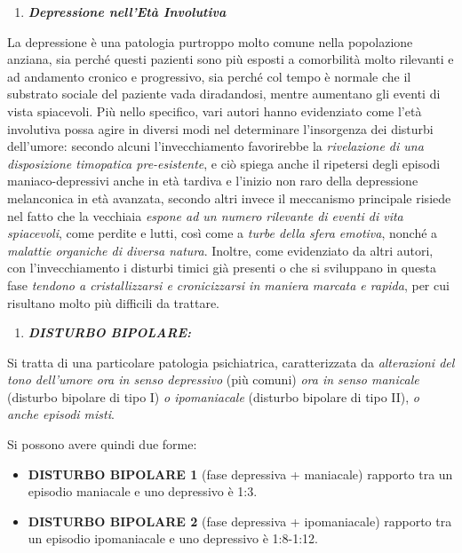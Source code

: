 \documentclass[]{article}
\begin{document}
\begin{enumerate}
\def\labelenumi{\arabic{enumi}.}
\item
  \textbf{\emph{Depressione nell'Età Involutiva}}
\end{enumerate}

La depressione è una patologia purtroppo molto comune nella popolazione
anziana, sia perché questi pazienti sono più esposti a comorbilità molto
rilevanti e ad andamento cronico e progressivo, sia perché col tempo è
normale che il substrato sociale del paziente vada diradandosi, mentre
aumentano gli eventi di vista spiacevoli. Più nello specifico, vari
autori hanno evidenziato come l'età involutiva possa agire in diversi
modi nel determinare l'insorgenza dei disturbi dell'umore: secondo
alcuni l'invecchiamento favorirebbe la \emph{rivelazione di una
disposizione timopatica pre-esistente}, e ciò spiega anche il ripetersi
degli episodi maniaco-depressivi anche in età tardiva e l'inizio non
raro della depressione melanconica in età avanzata, secondo altri invece
il meccanismo principale risiede nel fatto che la vecchiaia \emph{espone
ad un numero rilevante di eventi di vita spiacevoli}, come perdite e
lutti, così come a \emph{turbe della sfera emotiva}, nonché a
\emph{malattie organiche di diversa natura}. Inoltre, come evidenziato
da altri autori, con l'invecchiamento i disturbi timici già presenti o
che si sviluppano in questa fase \emph{tendono a cristallizzarsi e
cronicizzarsi in maniera marcata e rapida}, per cui risultano molto più
difficili da trattare.

\begin{enumerate}
\def\labelenumi{\arabic{enumi}.}
\item
  \textbf{\emph{DISTURBO BIPOLARE:}}
\end{enumerate}

Si tratta di una particolare patologia psichiatrica, caratterizzata da
\emph{alterazioni del tono dell'umore ora in senso depressivo} (più
comuni) \emph{ora in senso manicale} (disturbo bipolare di tipo I)
\emph{o ipomaniacale} (disturbo bipolare di tipo II), \emph{o anche
episodi misti}.

Si possono avere quindi due forme:

\begin{itemize}
\item
  \textbf{DISTURBO BIPOLARE 1} (fase depressiva + maniacale) rapporto
  tra un episodio maniacale e uno depressivo è 1:3.
\item
  \textbf{DISTURBO BIPOLARE 2} (fase depressiva + ipomaniacale) rapporto
  tra un episodio ipomaniacale e uno depressivo è 1:8-1:12.
\end{itemize}
\end{document}
